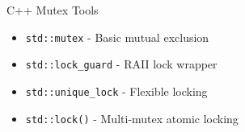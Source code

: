 \begin{frame}{C++ Mutex Tools}
	\begin{itemize}
		\item \texttt{std::mutex} - Basic mutual exclusion
		\item \texttt{std::lock\_guard} - RAII lock wrapper
		\item \texttt{std::unique\_lock} - Flexible locking
		\item \texttt{std::lock()} - Multi-mutex atomic locking
	\end{itemize}
\end{frame}
